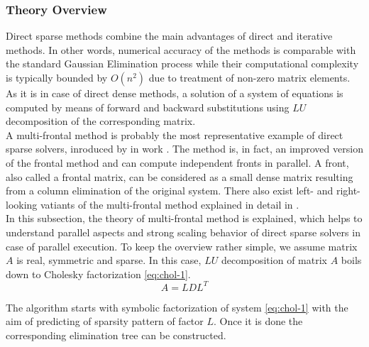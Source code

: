 \subsubsection{Theory Overview}
\label{subseq:direct-sparse methods}

Direct sparse methods combine the main advantages of direct and iterative methods. In other words, numerical accuracy of the methods is comparable with the standard Gaussian Elimination process while their computational complexity is typically bounded by $O(n^2)$ \cite{complexity-of-spdm} due to treatment of non-zero matrix elements. As it is in case of direct dense methods, a solution of a system of equations is computed by means of forward and backward substitutions using $LU$ decomposition of the corresponding matrix.\\


A multi-frontal method is probably the most representative example of direct sparse solvers, inroduced by \citeauthor{mult-frontal-original:1} in work \cite{mult-frontal-original:1}. The method is, in fact, an improved version of the frontal method \cite{frontal-original} and can compute independent fronts in parallel. A front, also called a frontal matrix, can be considered as a small dense matrix resulting from a column elimination of the original system. There also exist left- and right-looking vatiants of the multi-frontal method explained in detail in \cite{elimination-tree}.\\


In this subsection, the theory of multi-frontal method is explained, which helps to understand parallel aspects and strong scaling behavior of   direct sparse solvers in case of parallel execution. To keep the overview rather simple, we assume matrix $A$ is real, symmetric and sparse. In this case, $LU$ decomposition of matrix $A$ boils down to Cholesky factorization \ref{eq:chol-1}.\\

\begin{equation} \label{eq:chol-1}
	A = LDL^T
\end{equation}

The algorithm starts with symbolic factorization of system \ref{eq:chol-1} with the aim of predicting of sparsity pattern of factor $L$. Once it is done the corresponding elimination tree can be constructed.\\

\figpointer{\ref{fig:sparsity-pattern-example-mm}}

